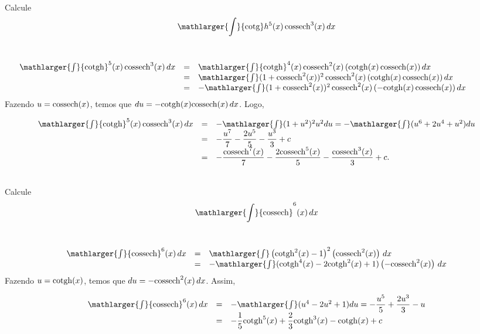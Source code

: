 \cleardoublepage\documentclass[../main.tex]{subfiles}
\begin{document}
\begin{ex}~
\\Calcule
\[ \mathlarger{\int}{\rm cotg}h^5( x) \,{\rm cossech}^3 (x)\,dx\]\\

\begin{solution}
\[ \begin{array}{lll} \hspace*{-1.2cm}\mathlarger{\int}{\rm cotgh}^5( x) \,{\rm cossech}^3 (x)\,dx &=& \mathlarger{\int}{\rm cotgh}^4( x) \,{\rm cossech}^2 (x)\left({\rm cotgh} (x)\, {\rm cossech} (x)\right)dx\\ &=& \mathlarger{\int}(1+{\rm cossech}^2 (x))^2 \,{\rm cossech}^2( x)\left({\rm cotgh} (x)\, {\rm cossech} (x)\right)dx\\ &=& -\mathlarger{\int}(1+{\rm cossech}^2 (x))^2 \,{\rm cossech}^2( x)\left(-{\rm cotgh} (x)\, {\rm cossech} (x)\right)dx\\ \end{array} \]
Fazendo \(u={\rm cossech}(x) \), temos que \( du=-{\rm cotgh}(x){\rm cossech}(x)\,dx \). Logo,

\[ \begin{array}{rcl} \mathlarger{\int}{\rm cotgh}^5( x) \,{\rm cossech}^3 (x)\,dx&=& -\mathlarger{\int}(1+u^2 )^2 u^2du=-\mathlarger{\int}(u^6+2u^4 + u^2)du\\ &=&-\dfrac{u^7}{7}-\dfrac{2u^5}{5}-\dfrac{u^3}{3}+c\\ &=&-\dfrac{{\rm cossech}^7(x)}{7}-\dfrac{2{\rm cossech}^5(x)}{5}-\dfrac{{\rm cossech}^3(x)}{3}+c. \end{array} \]
\end{solution}
\end{ex}
\begin{ex}~
\\Calcule
\[ \mathlarger{\int} {\rm cossech}^6( x)\, dx\]\\
\begin{solution}
\[ \begin{array}{rcl} \mathlarger{\int} {\rm cossech}^6(x)\, dx &=& \mathlarger{\int}\left({\rm cotgh}^2( x) -1\right)^2\left({\rm cossech}^2 (x)\right)\,dx\\ &=& -\mathlarger{\int}({\rm cotgh}^4 (x) -2 {\rm cotgh}^2( x) +1)\left(-{\rm cossech}^2( x)\right)\,dx\\ \end{array} \]
Fazendo \( u={\rm cotgh}(x)\), temos que \( du=-{\rm cossech}^2(x)\,dx \). Assim,

\[ \begin{array}{rcl} \mathlarger{\int} {\rm cossech}^6(x)\, dx &=&-\mathlarger{\int}(u^4 -2 u^2 +1)du=-\dfrac{u^5}{5}+\dfrac{2u^3}{3}-u\\ &=&-\dfrac{1}{5} {\rm cotgh}^5( x) +\dfrac{2}{3} {\rm cotgh}^3( x) -{\rm cotgh}( x) +c \end{array} \]
\end{solution}
\end{ex}
\end{document}
